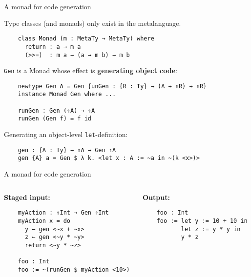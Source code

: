 \documentclass[dvipsnames,aspectratio=169]{beamer}
\newcommand{\ttt}[1]{{\texttt{#1}}}
\theoremstyle{remark}
\begin{document}
\begin{frame}[fragile]{A monad for code generation}

Type classes (and monads) only exist in the metalanguage.
\begin{verbatim}
    class Monad (m : MetaTy → MetaTy) where
      return : a → m a
      (>>=)  : m a → (a → m b) → m b
\end{verbatim}
\pause
\ttt{Gen} is a Monad whose effect is \textbf{generating object code}:
\begin{verbatim}
    newtype Gen A = Gen {unGen : {R : Ty} → (A → ⇑R) → ⇑R}
    instance Monad Gen where ...

    runGen : Gen (⇑A) → ⇑A
    runGen (Gen f) = f id
\end{verbatim}
\pause
Generating an object-level \ttt{let}-definition:
\begin{verbatim}
    gen : {A : Ty} → ⇑A → Gen ⇑A
    gen {A} a = Gen $ λ k. <let x : A := ~a in ~(k <x>)>
\end{verbatim}

\end{frame}

\begin{frame}[fragile]{A monad for code generation}

\begin{columns}
\begin{column}{0.4\textwidth}
\textbf{Staged input:}
\begin{verbatim}
    myAction : ⇑Int → Gen ⇑Int
    myAction x = do
      y ← gen <~x + ~x>
      z ← gen <~y * ~y>
      return <~y * ~z>

    foo : Int
    foo := ~(runGen $ myAction <10>)
\end{verbatim}
\end{column}
\begin{column}{0.5\textwidth}
\textbf{Output:}
\begin{verbatim}
    foo : Int
    foo := let y := 10 + 10 in
           let z := y * y in
           y * z




\end{verbatim}
\end{column}
\end{columns}

\end{frame}
\end{document}
